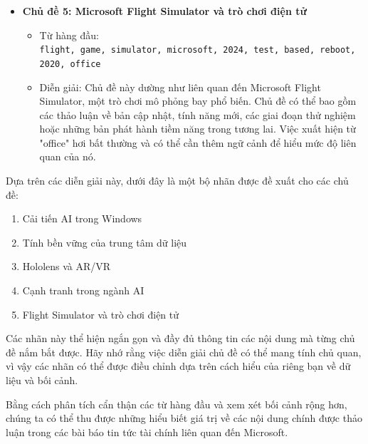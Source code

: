 \begin{itemize}
  \begin{itemize}
    \item
    Từ hàng đầu: \texttt{openai,\ google,\ ai,\ microsoft,\ stay,\ date,\ financial,\ way,\ competition,\ amid}
  \item
    Diễn giải: Chủ đề này xoay quanh sự cạnh tranh trong lĩnh vực trí tuệ nhân tạo, chủ yếu liên quan đến Microsoft, OpenAI và Google. Chủ đề có thể thảo luận về các khía cạnh tài chính, quan hệ đối tác chiến lược và bức tranh tổng thể của cuộc đua AI.
  \end{itemize}
\item
  \textbf{Chủ đề 5: Microsoft Flight Simulator và trò chơi điện tử}

  \begin{itemize}
    \item
    Từ hàng đầu: \texttt{flight,\ game,\ simulator,\ microsoft,\ 2024,\ test,\ based,\ reboot,\ 2020,\ office}
  \item
    Diễn giải: Chủ đề này dường như liên quan đến Microsoft Flight Simulator, một trò chơi mô phỏng bay phổ biến. Chủ đề có thể bao gồm các thảo luận về bản cập nhật, tính năng mới, các giai đoạn thử nghiệm hoặc những bản phát hành tiềm năng trong tương lai. Việc xuất hiện từ "office" hơi bất thường và có thể cần thêm ngữ cảnh để hiểu mức độ liên quan của nó.
  \end{itemize}
\end{itemize}

Dựa trên các diễn giải này, dưới đây là một bộ nhãn được đề xuất cho các chủ đề:

\begin{enumerate}
\def\labelenumi{\arabic{enumi}.}
\item
  Cải tiến AI trong Windows
\item
  Tính bền vững của trung tâm dữ liệu
\item
  Hololens và AR/VR
\item
  Cạnh tranh trong ngành AI
\item
  Flight Simulator và trò chơi điện tử
\end{enumerate}

Các nhãn này thể hiện ngắn gọn và đầy đủ thông tin các nội dung mà từng chủ đề nắm bắt được. Hãy nhớ rằng việc diễn giải chủ đề có thể mang tính chủ quan, vì vậy các nhãn có thể được điều chỉnh dựa trên cách hiểu của riêng bạn về dữ liệu và bối cảnh.

Bằng cách phân tích cẩn thận các từ hàng đầu và xem xét bối cảnh rộng hơn, chúng ta có thể thu được những hiểu biết giá trị về các nội dung chính được thảo luận trong các bài báo tin tức tài chính liên quan đến Microsoft.

